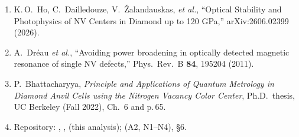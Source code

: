 \documentclass[11pt,a4paper]{ltjsarticle}
\begin{document}
\begin{enumerate}[leftmargin=8mm]
  \item K.\,O.\ Ho, C.\ Dailledouze, V.\ \v{Z}alandauskas, \emph{et al.}, ``Optical Stability and Photophysics of NV Centers in Diamond up to 120 GPa,'' arXiv:2606.02399 (2026).
  \item A.\ Dr\'eau \emph{et al.}, ``Avoiding power broadening in optically detected magnetic resonance of single NV defects,'' Phys.\ Rev.\ B \textbf{84}, 195204 (2011).
  \item P.\ Bhattacharyya, \emph{Principle and Applications of Quantum Metrology in Diamond Anvil Cells using the Nitrogen Vacancy Color Center}, Ph.D.\ thesis, UC Berkeley (Fall 2022), Ch.\ 6 and p.\,65.
  \item Repository: , ,  (this analysis);  (A2, N1--N4),  \S6.
\end{enumerate}
\end{document}
